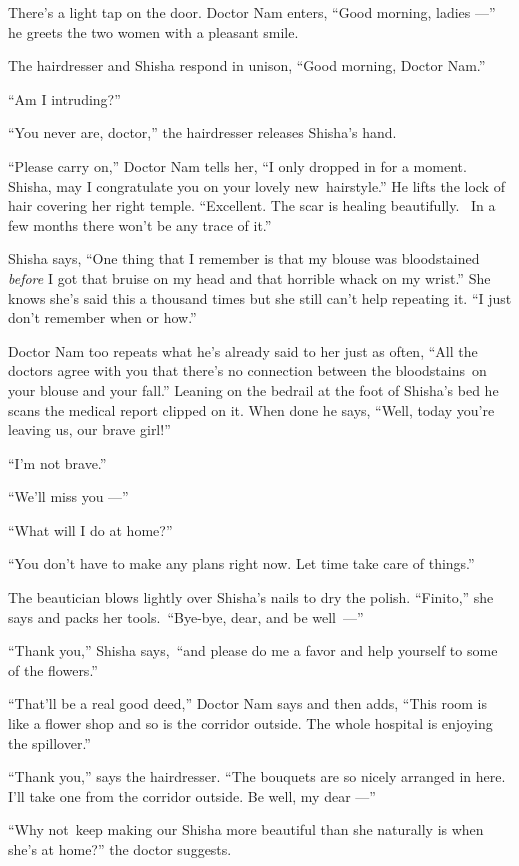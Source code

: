 \documentclass[twoside,11pt]{book}
\begin{document}
There's a light tap on the door. Doctor Nam enters, ``Good morning, ladies ---'' he greets the
two women with a pleasant smile.

The hairdresser and Shisha respond in unison, ``Good morning, Doctor Nam.''

``Am I intruding?''

``You never are, doctor,'' the hairdresser releases Shisha's hand.

``Please carry on,'' Doctor Nam tells her, ``I only dropped in for a moment.
Shisha, may I congratulate you on your lovely new~hairstyle.'' He lifts the lock of hair covering her
right temple. ``Excellent. The scar is healing beautifully. ~In a few months there won't be any trace of
it.''

Shisha says, ``One thing that I remember is that my blouse was bloodstained \textit{before} I got that
bruise on my head and that horrible whack on my wrist.'' She knows she's said this a thousand times but
she still can't help repeating it. ``I just don't remember when or how.''

Doctor Nam too repeats what he's already said to her just as often, ``All the doctors agree with you that
there's no connection between the bloodstains~on your blouse and your fall.'' Leaning on the bedrail at
the foot of Shisha's bed he scans the medical report clipped on it. When done he says, ``Well, today
you're leaving us, our brave girl!''

``I'm not brave.''

``We'll miss you ---''

``What will I do at home?''

``You don't have to make any plans right now. Let time take care of things.''

The beautician blows lightly over Shisha's nails to dry the polish. ``Finito,''
she says and packs her tools.~``Bye-bye, dear, and be \hbox{well ---''}

``Thank you,'' Shisha says,~``and please do me a favor and help yourself to some
of the flowers.''

``That'll be a real good deed,'' Doctor Nam says and then adds, ``This room is
like a flower shop and so is the corridor outside. The whole hospital is enjoying the spillover.''

``Thank you,'' says the hairdresser. ``The bouquets are so nicely arranged in
here. I'll take one from the corridor outside. Be well, my dear ---''

``Why not~keep making our Shisha more beautiful than she naturally is when she's at home?''
the doctor suggests.
\end{document}
